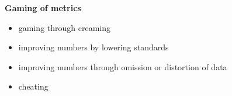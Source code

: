 \begin{frame}\textbf{Gaming of metrics}\\\vspace{0.3cm}
\begin{itemize}\setlength\itemsep{1em}
\item gaming through creaming
\item improving numbers by lowering standards
\item improving numbers through omission or distortion of data
\item cheating
\end{itemize}
\end{frame}
